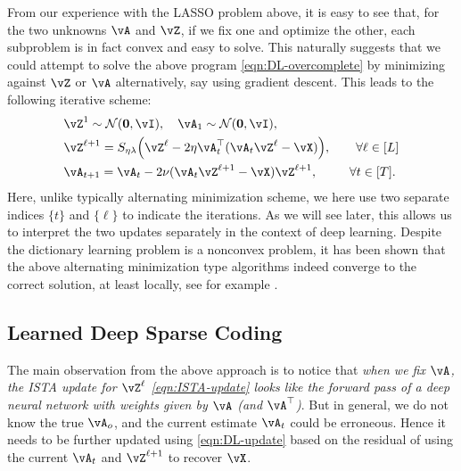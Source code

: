 \documentclass[\toplevelprefix/book-main.tex]{subfiles}
\begin{document}
From our experience with the LASSO problem above, it is easy to see that, for the two unknowns \(\vA\) and \(\vZ\), if we fix one and optimize the other, each subproblem is in fact convex and easy to solve. This naturally suggests that we could attempt to solve the above program \eqref{eqn:DL-overcomplete} by minimizing against \(\vZ\) or \(\vA\) alternatively, say using gradient descent. This leads to the following iterative scheme:
\begin{align}
    & \vZ^{1}
     \sim \dNorm(\vzero, \vI), \quad \vA_{1}
     \sim \dNorm(\vzero, \vI), \\ 
    &\vZ^{\ell + 1} = S_{\eta\lambda}\rp{\vZ^{\ell} - 2\eta\vA_{t}^{\top}(\vA_{t}\vZ^{\ell} - \vX)}, \qquad \forall \ell \in [L] \label{eqn:ISTA-update}\\ 
    &\vA_{t + 1} = \vA_{t} - 2\nu (\vA_{t}\vZ^{\ell + 1} - \vX)\vZ^{\ell + 1}, \qquad\;\; \forall t \in [T].\label{eqn:DL-update}
\end{align}
Here, unlike typically alternating minimization scheme, we here use two separate indices $\{t\}$ and $\{\ell\}$ to indicate the iterations. As we will see later, this allows us to interpret the two updates separately in the context of deep learning. Despite the dictionary learning problem is a nonconvex problem, it has been shown that the above alternating minimization type algorithms indeed converge to the correct solution, at least locally, see for example \cite{alekh-2016}.


\subsection{Learned Deep Sparse Coding}
\label{sec:LISTA}
The main observation from the above approach is to notice that \textit{when we fix \(\vA\), the ISTA update for $\vZ^\ell$ \eqref{eqn:ISTA-update} looks like the forward pass of a deep neural network with weights given by \(\vA\) (and \(\vA^{\top}\))}. But in general, we do not know the true $\vA_o$, and the current estimate $\vA_t$ could be erroneous. Hence it needs to be further updated using \eqref{eqn:DL-update} based on the residual of using the current $\vA_t$ and $\vZ^{\ell +1}$ to recover $\vX$. 
\end{document}
